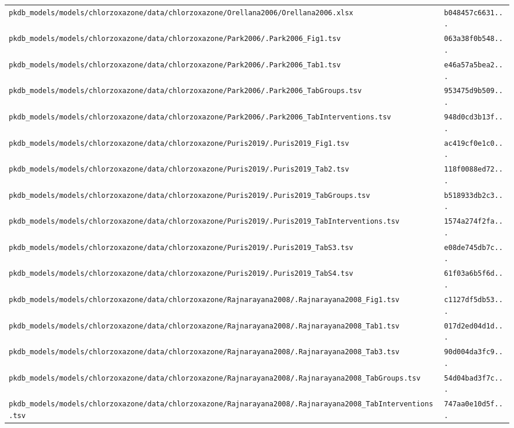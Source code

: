 \begin{longtable}{ll}
\texttt{pkdb\_models/models/chlorzoxazone/data/chlorzoxazone/Orellana2006/Orellana2006.xlsx} & \texttt{b048457c6631...} \\
\texttt{pkdb\_models/models/chlorzoxazone/data/chlorzoxazone/Park2006/.Park2006\_Fig1.tsv} & \texttt{063a38f0b548...} \\
\texttt{pkdb\_models/models/chlorzoxazone/data/chlorzoxazone/Park2006/.Park2006\_Tab1.tsv} & \texttt{e46a57a5bea2...} \\
\texttt{pkdb\_models/models/chlorzoxazone/data/chlorzoxazone/Park2006/.Park2006\_TabGroups.tsv} & \texttt{953475d9b509...} \\
\texttt{pkdb\_models/models/chlorzoxazone/data/chlorzoxazone/Park2006/.Park2006\_TabInterventions.tsv} & \texttt{948d0cd3b13f...} \\
\texttt{pkdb\_models/models/chlorzoxazone/data/chlorzoxazone/Puris2019/.Puris2019\_Fig1.tsv} & \texttt{ac419cf0e1c0...} \\
\texttt{pkdb\_models/models/chlorzoxazone/data/chlorzoxazone/Puris2019/.Puris2019\_Tab2.tsv} & \texttt{118f0088ed72...} \\
\texttt{pkdb\_models/models/chlorzoxazone/data/chlorzoxazone/Puris2019/.Puris2019\_TabGroups.tsv} & \texttt{b518933db2c3...} \\
\texttt{pkdb\_models/models/chlorzoxazone/data/chlorzoxazone/Puris2019/.Puris2019\_TabInterventions.tsv} & \texttt{1574a274f2fa...} \\
\texttt{pkdb\_models/models/chlorzoxazone/data/chlorzoxazone/Puris2019/.Puris2019\_TabS3.tsv} & \texttt{e08de745db7c...} \\
\texttt{pkdb\_models/models/chlorzoxazone/data/chlorzoxazone/Puris2019/.Puris2019\_TabS4.tsv} & \texttt{61f03a6b5f6d...} \\
\texttt{pkdb\_models/models/chlorzoxazone/data/chlorzoxazone/Rajnarayana2008/.Rajnarayana2008\_Fig1.tsv} & \texttt{c1127df5db53...} \\
\texttt{pkdb\_models/models/chlorzoxazone/data/chlorzoxazone/Rajnarayana2008/.Rajnarayana2008\_Tab1.tsv} & \texttt{017d2ed04d1d...} \\
\texttt{pkdb\_models/models/chlorzoxazone/data/chlorzoxazone/Rajnarayana2008/.Rajnarayana2008\_Tab3.tsv} & \texttt{90d004da3fc9...} \\
\texttt{pkdb\_models/models/chlorzoxazone/data/chlorzoxazone/Rajnarayana2008/.Rajnarayana2008\_TabGroups.tsv} & \texttt{54d04bad3f7c...} \\
\texttt{pkdb\_models/models/chlorzoxazone/data/chlorzoxazone/Rajnarayana2008/.Rajnarayana2008\_TabInterventions.tsv} & \texttt{747aa0e10d5f...} \\

\end{longtable}
